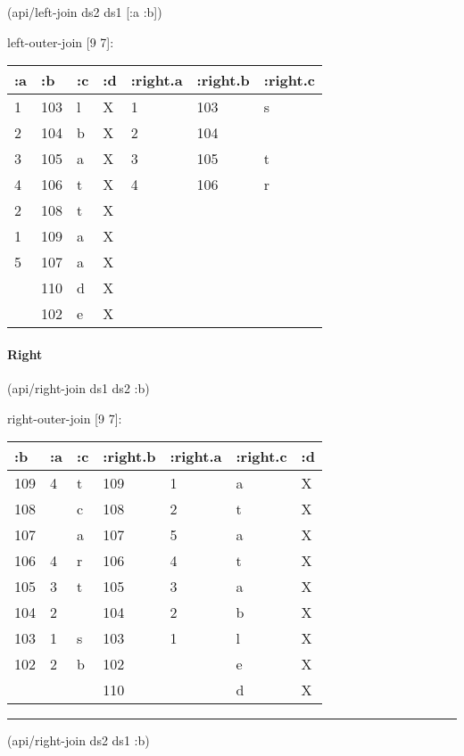 \documentclass[]{article}
\newenvironment{Shaded}{\begin{snugshade}}{\end{snugshade}}
\newcommand{\AttributeTok}[1]{\textcolor[rgb]{0.77,0.63,0.00}{#1}}
\newcommand{\NormalTok}[1]{#1}
\let\oldparagraph\paragraph
\renewcommand{\paragraph}[1]{\oldparagraph{#1}\mbox{}}
\begin{document}
\begin{Shaded}
\begin{Highlighting}[]
\NormalTok{(api/left-join ds2 ds1 [}\AttributeTok{:a} \AttributeTok{:b}\NormalTok{])}
\end{Highlighting}
\end{Shaded}

left-outer-join {[}9 7{]}:

\begin{longtable}[]{@{}lllllll@{}}
\toprule
:a & :b & :c & :d & :right.a & :right.b & :right.c\tabularnewline
\midrule
\endhead
1 & 103 & l & X & 1 & 103 & s\tabularnewline
2 & 104 & b & X & 2 & 104 &\tabularnewline
3 & 105 & a & X & 3 & 105 & t\tabularnewline
4 & 106 & t & X & 4 & 106 & r\tabularnewline
2 & 108 & t & X & & &\tabularnewline
1 & 109 & a & X & & &\tabularnewline
5 & 107 & a & X & & &\tabularnewline
& 110 & d & X & & &\tabularnewline
& 102 & e & X & & &\tabularnewline
\bottomrule
\end{longtable}

\hypertarget{right}{%
\paragraph{Right}\label{right}}

\begin{Shaded}
\begin{Highlighting}[]
\NormalTok{(api/right-join ds1 ds2 }\AttributeTok{:b}\NormalTok{)}
\end{Highlighting}
\end{Shaded}

right-outer-join {[}9 7{]}:

\begin{longtable}[]{@{}lllllll@{}}
\toprule
:b & :a & :c & :right.b & :right.a & :right.c & :d\tabularnewline
\midrule
\endhead
109 & 4 & t & 109 & 1 & a & X\tabularnewline
108 & & c & 108 & 2 & t & X\tabularnewline
107 & & a & 107 & 5 & a & X\tabularnewline
106 & 4 & r & 106 & 4 & t & X\tabularnewline
105 & 3 & t & 105 & 3 & a & X\tabularnewline
104 & 2 & & 104 & 2 & b & X\tabularnewline
103 & 1 & s & 103 & 1 & l & X\tabularnewline
102 & 2 & b & 102 & & e & X\tabularnewline
& & & 110 & & d & X\tabularnewline
\bottomrule
\end{longtable}

\begin{center}\rule{0.5\linewidth}{0.5pt}\end{center}

\begin{Shaded}
\begin{Highlighting}[]
\NormalTok{(api/right-join ds2 ds1 }\AttributeTok{:b}\NormalTok{)}
\end{Highlighting}
\end{Shaded}
\end{document}
